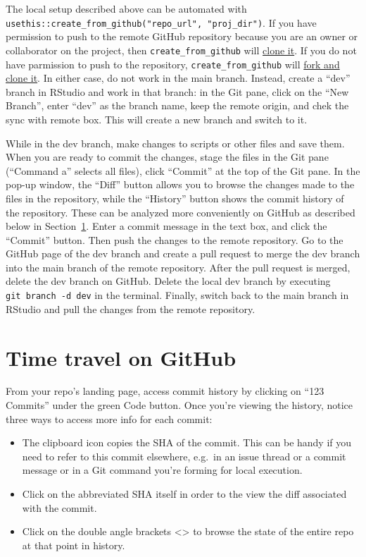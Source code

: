 \documentclass[
  letterpaper,
  DIV=11,
  numbers=noendperiod]{scrreport}
\begin{document}
The local setup described above can be automated with
\texttt{usethis::create\_from\_github("repo\_url",\ "proj\_dir")}. If
you have permission to push to the remote GitHub repository because you
are an owner or collaborator on the project, then
\texttt{create\_from\_github} will
\href{https://happygitwithr.com/existing-github-first\#git-clone-usethis-rstudio}{clone
it}. If you do not have parmission to push to the repository,
\texttt{create\_from\_github} will
\href{https://happygitwithr.com/fork-and-clone\#fork-and-clone-create-from-github}{fork
and clone it}. In either case, do not work in the main branch. Instead,
create a ``dev'' branch in RStudio and work in that branch: in the Git
pane, click on the ``New Branch'', enter ``dev'' as the branch name,
keep the remote origin, and chek the sync with remote box. This will
create a new branch and switch to it.

While in the dev branch, make changes to scripts or other files and save
them. When you are ready to commit the changes, stage the files in the
Git pane (``Command a'' selects all files), click ``Commit'' at the top
of the Git pane. In the pop-up window, the ``Diff'' button allows you to
browse the changes made to the files in the repository, while the
``History'' button shows the commit history of the repository. These can
be analyzed more conveniently on GitHub as described below in
Section~\ref{sec-browse-commits}. Enter a commit message in the text
box, and click the ``Commit'' button. Then push the changes to the
remote repository. Go to the GitHub page of the dev branch and create a
pull request to merge the dev branch into the main branch of the remote
repository. After the pull request is merged, delete the dev branch on
GitHub. Delete the local dev branch by executing
\texttt{git\ branch\ -d\ dev} in the terminal. Finally, switch back to
the main branch in RStudio and pull the changes from the remote
repository.

\section{Time travel on GitHub}\label{sec-browse-commits}

From your repo's landing page, access commit history by clicking on
``123 Commits'' under the green Code button. Once you're viewing the
history, notice three ways to access more info for each commit:

\begin{itemize}
\item
  The clipboard icon copies the SHA of the commit. This can be handy if
  you need to refer to this commit elsewhere, e.g.~in an issue thread or
  a commit message or in a Git command you're forming for local
  execution.
\item
  Click on the abbreviated SHA itself in order to the view the diff
  associated with the commit.
\item
  Click on the double angle brackets \textless\textgreater{} to browse
  the state of the entire repo at that point in history.
\end{itemize}
\end{document}
